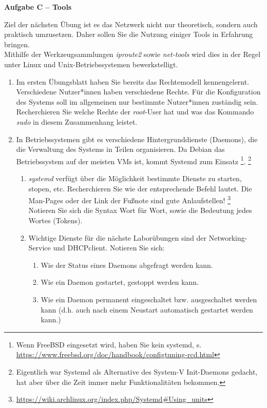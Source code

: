 \documentclass[paper=a4,fontsize=11pt]{scrartcl}%
\numberwithin{equation}{section}
\begin{document}
\begin{center}\Large{\textbf{Aufgabe C -- Tools}}\end{center}
Ziel der nächsten Übung ist es das Netzwerk nicht nur theoretisch, sondern auch praktisch umzusetzen. Daher sollen Sie die Nutzung einiger Tools in Erfahrung bringen.\\
Mithilfe der Werkzeugsammlungen \emph{iproute2} sowie \emph{net-tools} wird dies in der Regel unter Linux und Unix-Betriebssystemen bewerkstelligt.
\begin{enumerate}
	\item Im ersten Übungsblatt haben Sie bereits das Rechtemodell kennengelernt. Verschiedene Nutzer*innen haben verschiedene Rechte. Für die Konfiguration des Systems soll im allgemeinen nur bestimmte Nutzer*innen zuständig sein. Recherchieren Sie welche Rechte der \emph{root}-User hat und was das Kommando \emph{sudo} in diesem Zusammenhang leistet.
	\item In Betriebssystemen gibt es verschiedene Hintergrunddienste (Daemons), die die Verwaltung des Systems in Teilen organisieren. Da Debian das Betriebssystem auf der meisten VMs ist, kommt Systemd zum Einsatz \footnote{Wenn FreeBSD eingesetzt wird, haben Sie kein systemd, s. \url{https://www.freebsd.org/doc/handbook/configtuning-rcd.html}}. \footnote{Eigentlich war Systemd als Alternative des System-V Init-Daemons gedacht, hat aber über die Zeit immer mehr Funktionalitäten bekommen.}
	\begin{enumerate}
		\item \emph{systemd} verfügt über die Möglichkeit bestimmte Dienste zu starten, stopen, etc. Recherchieren Sie wie der entsprechende Befehl lautet. Die Man-Pages oder der Link der Fußnote sind gute Anlaufstellen!
		\footnote{\url{https://wiki.archlinux.org/index.php/Systemd\#Using_units}}\\
		Notieren Sie sich die Syntax Wort für Wort, sowie die Bedeutung jedes Wortes (Tokens). 
		\item Wichtige Dienste für die nächste Laborübungen sind der Networking-Service und DHCPclient. Notieren Sie sich:
		\begin{enumerate}
			\item Wie der Status eines Daemons abgefragt werden kann.
			\item Wie ein Daemon gestartet, gestoppt werden kann.
			\item Wie ein Daemon permanent eingeschaltet bzw. ausgeschaltet werden kann (d.h. auch nach einem Neustart automatisch gestartet werden kann.)

\end{enumerate}
\end{enumerate}
\end{enumerate}
\end{document}
